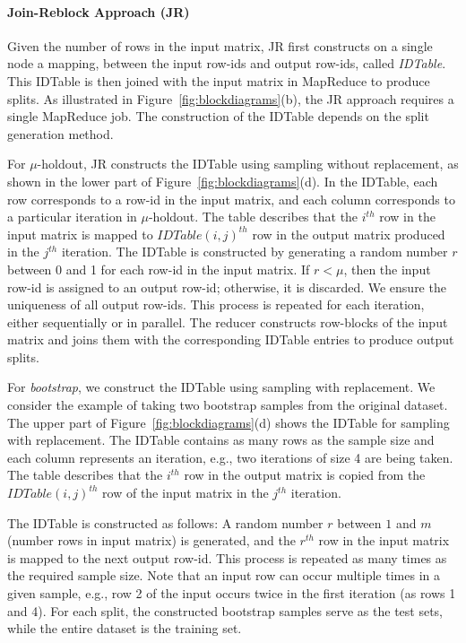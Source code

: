 \documentclass{vldb}
\begin{document}
\paragraph*{Join-Reblock Approach (JR)}
Given the number of rows in the input matrix, JR first constructs on a single node a mapping, between the input row-ids and output row-ids, called \textit{IDTable}.
This IDTable is then joined with the input matrix in MapReduce to produce splits.
As illustrated in Figure~\ref{fig:blockdiagrams}(b), the JR approach requires a single MapReduce job. The construction of the IDTable depends on the split generation method.

For $\mu$-holdout, JR constructs the IDTable using sampling without replacement, as shown in
the lower part of Figure~\ref{fig:blockdiagrams}(d).
In the IDTable, each row corresponds to a row-id in the input matrix, and each column
corresponds to a particular iteration in $\mu$-holdout.
The table describes that the $i^{th}$ row in the input matrix is mapped
to $IDTable(i,j)^{th}$ row in the output matrix produced in the $j^{th}$ iteration.
The IDTable is constructed by generating a random
number $r$ between 0 and 1 for each row-id in the input matrix.
If $r < \mu$, then the input row-id is assigned to an output row-id; otherwise, it is
discarded.
We ensure the uniqueness of all output row-ids. This process is repeated for
each iteration, either sequentially or in parallel.
The reducer constructs row-blocks of the input matrix and joins them
with the corresponding IDTable entries to produce output splits.

For \emph{bootstrap}, we construct the IDTable using sampling with replacement. We consider the example of taking
two bootstrap samples from the original dataset.
The upper part of Figure~\ref{fig:blockdiagrams}(d) shows the IDTable for sampling with replacement. The IDTable
contains as many rows as the sample size and each column represents an iteration, e.g., two iterations of size 4 are being taken.
The table describes that the $i^{th}$ row in the output matrix is copied
from the $IDTable(i,j)^{th}$ row of the input matrix in the $j^{th}$ iteration.

The IDTable is constructed as follows: A random number $r$ between
$1$ and $m$ (number rows in input matrix) is generated,
and the $r^{th}$ row in the input matrix is mapped to the next output row-id.
This process is repeated as many times as the required sample size.
Note that an input row can occur multiple times in a given sample, e.g.,
row 2 of the input occurs twice in the first iteration (as rows 1 and 4).
For each split, the constructed bootstrap samples serve as the test sets, while the entire dataset is
the training set.
\end{document}
